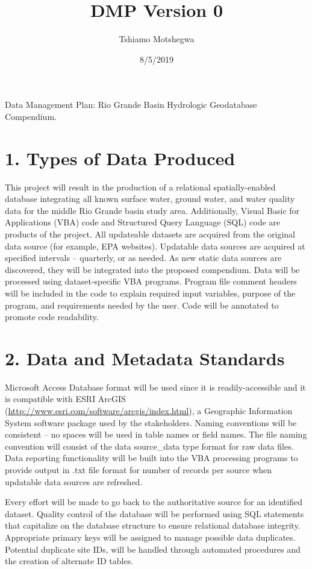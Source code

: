 \documentclass[]{article}
\title{DMP Version 0}
\author{Tshiamo Motshegwa}
\date{8/5/2019}
\begin{document}
\maketitle

Data Management Plan: Rio Grande Basin Hydrologic Geodatabase
Compendium.

\section{1. Types of Data Produced}\label{types-of-data-produced}

This project will result in the production of a relational
spatially-enabled database integrating all known surface water, ground
water, and water quality data for the middle Rio Grande basin study
area. Additionally, Visual Basic for Applications (VBA) code and
Structured Query Language (SQL) code are products of the project. All
updateable datasets are acquired from the original data source (for
example, EPA websites). Updatable data sources are acquired at specified
intervals -- quarterly, or as needed. As new static data sources are
discovered, they will be integrated into the proposed compendium. Data
will be processed using dataset‐specific VBA programs. Program file
comment headers will be included in the code to explain required input
variables, purpose of the program, and requirements needed by the user.
Code will be annotated to promote code readability.

\section{2. Data and Metadata
Standards}\label{data-and-metadata-standards}

Microsoft Access Database format will be used since it is
readily-accessible and it is compatible with ESRI ArcGIS
(\url{http://www.esri.com/software/arcgis/index.html}), a Geographic
Information System software package used by the stakeholders. Naming
conventions will be consistent -- no spaces will be used in table names
or field names. The file naming convention will consist of the data
source\_data type format for raw data files. Data reporting
functionality will be built into the VBA processing programs to provide
output in .txt file format for number of records per source when
updatable data sources are refreshed.

Every effort will be made to go back to the authoritative source for an
identified dataset. Quality control of the database will be performed
using SQL statements that capitalize on the database structure to ensure
relational database integrity. Appropriate primary keys will be assigned
to manage possible data duplicates. Potential duplicate site IDs, will
be handled through automated procedures and the creation of alternate ID
tables.
\end{document}
